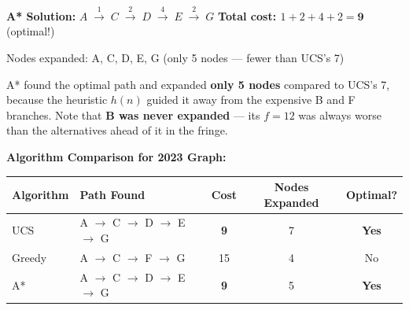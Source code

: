 \documentclass[12pt, a4paper]{article}
\newenvironment{answerbox}{\begin{mdframed}[style=answerframe]}{\end{mdframed}}
\begin{document}
\begin{answerbox}
\textbf{A* Solution:} $A \;\xrightarrow{1}\; C \;\xrightarrow{2}\; D \;\xrightarrow{4}\; E \;\xrightarrow{2}\; G$
\hfill \textbf{Total cost: $1+2+4+2 = \mathbf{9}$} (optimal!)

Nodes expanded: A, C, D, E, G \quad(only 5 nodes — fewer than UCS's 7)

A* found the optimal path and expanded \textbf{only 5 nodes} compared to UCS's 7, because the heuristic $h(n)$ guided it away from the expensive B and F branches. Note that \textbf{B was never expanded} — its $f{=}12$ was always worse than the alternatives ahead of it in the fringe.
\end{answerbox}

\vspace{0.8em}

\noindent\textbf{Algorithm Comparison for 2023 Graph:}
\begin{center}
\renewcommand{\arraystretch}{1.3}
\begin{tabular}{l|l|c|c|c}
\toprule
\textbf{Algorithm} & \textbf{Path Found} & \textbf{Cost} & \textbf{Nodes Expanded} & \textbf{Optimal?} \\
\midrule
UCS    & A $\to$ C $\to$ D $\to$ E $\to$ G & \textbf{9} & 7 & \textbf{Yes} \\
Greedy & A $\to$ C $\to$ F $\to$ G          & 15 & 4 & No \\
A*     & A $\to$ C $\to$ D $\to$ E $\to$ G & \textbf{9} & 5 & \textbf{Yes} \\
\bottomrule
\end{tabular}
\end{center}
\end{document}
